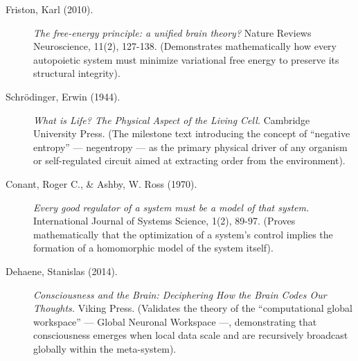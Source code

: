 \documentclass[11pt,a4paper,oneside]{article} %
\begin{document}
\hypertarget{a1.1-original-driver-and-thermodynamic-homeostasis}{%
\label{a1.1-original-driver-and-thermodynamic-homeostasis}}

\begin{description}
\item[Friston, Karl (2010).] \emph{The free-energy principle: a unified brain theory?} Nature Reviews Neuroscience, 11(2), 127-138. (Demonstrates mathematically how every autopoietic system must minimize variational free energy to preserve its structural integrity).

\item[Schrödinger, Erwin (1944).] \emph{What is Life? The Physical Aspect of the Living Cell.} Cambridge University Press. (The milestone text introducing the concept of ``negative entropy'' --- negentropy --- as the primary physical driver of any organism or self-regulated circuit aimed at extracting order from the environment).
\end{description}

\hypertarget{a1.2-cognitive-scaling-and-the-emergence-of-consciousness}{%
\label{a1.2-cognitive-scaling-and-the-emergence-of-consciousness}}

\begin{description}
\item[Conant, Roger C., \& Ashby, W. Ross (1970).] \emph{Every good regulator of a system must be a model of that system.} International Journal of Systems Science, 1(2), 89-97. (Proves mathematically that the optimization of a system's control implies the formation of a homomorphic model of the system itself).

\item[Dehaene, Stanislas (2014).] \emph{Consciousness and the Brain: Deciphering How the Brain Codes Our Thoughts.} Viking Press. (Validates the theory of the ``computational global workspace'' --- Global Neuronal Workspace ---, demonstrating that consciousness emerges when local data scale and are recursively broadcast globally within the meta-system).
\end{description}

\hypertarget{a1.3-emotional-system-as-a-computational-heuristic}{%
\label{a1.3-emotional-system-as-a-computational-heuristic}}
\end{document}
